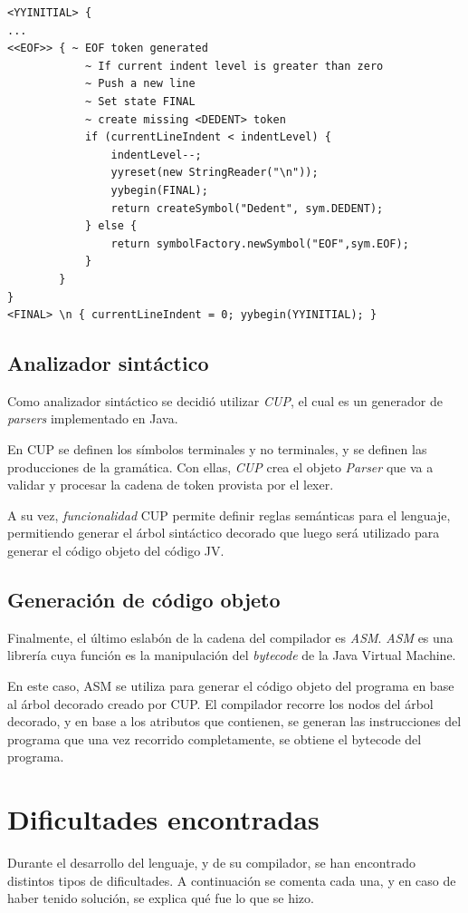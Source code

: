 \documentclass{article}
\begin{document}
\clearpage
            \begin{lstlisting}
<YYINITIAL> {
...
<<EOF>> { ~ EOF token generated
            ~ If current indent level is greater than zero
            ~ Push a new line
            ~ Set state FINAL
            ~ create missing <DEDENT> token
			if (currentLineIndent < indentLevel) {
				indentLevel--;
				yyreset(new StringReader("\n"));
				yybegin(FINAL);
				return createSymbol("Dedent", sym.DEDENT);
			} else {
				return symbolFactory.newSymbol("EOF",sym.EOF);
			}
		}
}
<FINAL> \n { currentLineIndent = 0; yybegin(YYINITIAL); }
            \end{lstlisting}
        \subsection{Analizador sintáctico}
            \par Como analizador sintáctico se decidió utilizar \textit{CUP}, el cual es un generador de \textit{parsers} implementado en Java. 
            \par En CUP se definen los símbolos terminales y no terminales, y se definen las producciones de la gramática. Con ellas, \textit{CUP} crea el objeto \textit{Parser} que va a validar y procesar la cadena de token provista por el lexer.
            \par A su vez, \textit{funcionalidad} CUP permite definir reglas semánticas para el lenguaje, permitiendo generar el árbol sintáctico decorado que luego será utilizado para generar el código objeto del código JV.

        \subsection{Generación de código objeto}
            \par Finalmente, el último eslabón de la cadena del compilador es \textit{ASM}. \textit{ASM} es una librería cuya función es la manipulación del \textit{bytecode} de la Java Virtual Machine.
            \par En este caso, ASM se utiliza para generar el código objeto del programa en base al árbol decorado creado por CUP. El compilador recorre los nodos del árbol decorado, y en base a los atributos que contienen, se generan las instrucciones del programa que una vez recorrido completamente, se obtiene el bytecode del programa.

        \clearpage

    \section{Dificultades encontradas}
        \par Durante el desarrollo del lenguaje, y de su compilador, se han encontrado distintos tipos de dificultades. A continuación se comenta cada una, y en caso de haber tenido solución, se explica qué fue lo que se hizo.
\end{document}

